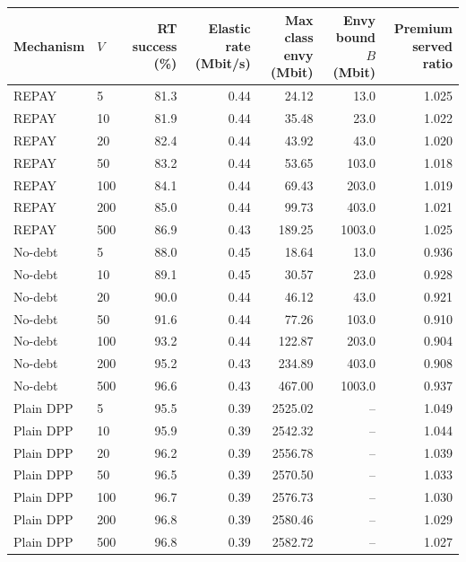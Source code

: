 \begin{tabular}{llrrrrr}
\toprule
Mechanism & $V$ & RT success (\%) & Elastic rate (Mbit/s) & Max class envy (Mbit) & Envy bound $B$ (Mbit) & Premium served ratio \\
\midrule
REPAY & 5 & 81.3 & 0.44 & 24.12 & 13.0 & 1.025 \\
REPAY & 10 & 81.9 & 0.44 & 35.48 & 23.0 & 1.022 \\
REPAY & 20 & 82.4 & 0.44 & 43.92 & 43.0 & 1.020 \\
REPAY & 50 & 83.2 & 0.44 & 53.65 & 103.0 & 1.018 \\
REPAY & 100 & 84.1 & 0.44 & 69.43 & 203.0 & 1.019 \\
REPAY & 200 & 85.0 & 0.44 & 99.73 & 403.0 & 1.021 \\
REPAY & 500 & 86.9 & 0.43 & 189.25 & 1003.0 & 1.025 \\
\midrule
No-debt & 5 & 88.0 & 0.45 & 18.64 & 13.0 & 0.936 \\
No-debt & 10 & 89.1 & 0.45 & 30.57 & 23.0 & 0.928 \\
No-debt & 20 & 90.0 & 0.44 & 46.12 & 43.0 & 0.921 \\
No-debt & 50 & 91.6 & 0.44 & 77.26 & 103.0 & 0.910 \\
No-debt & 100 & 93.2 & 0.44 & 122.87 & 203.0 & 0.904 \\
No-debt & 200 & 95.2 & 0.43 & 234.89 & 403.0 & 0.908 \\
No-debt & 500 & 96.6 & 0.43 & 467.00 & 1003.0 & 0.937 \\
\midrule
Plain DPP & 5 & 95.5 & 0.39 & 2525.02 & -- & 1.049 \\
Plain DPP & 10 & 95.9 & 0.39 & 2542.32 & -- & 1.044 \\
Plain DPP & 20 & 96.2 & 0.39 & 2556.78 & -- & 1.039 \\
Plain DPP & 50 & 96.5 & 0.39 & 2570.50 & -- & 1.033 \\
Plain DPP & 100 & 96.7 & 0.39 & 2576.73 & -- & 1.030 \\
Plain DPP & 200 & 96.8 & 0.39 & 2580.46 & -- & 1.029 \\
Plain DPP & 500 & 96.8 & 0.39 & 2582.72 & -- & 1.027 \\
\bottomrule
\end{tabular}
